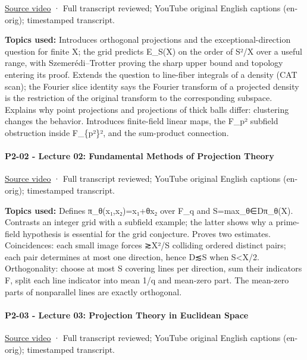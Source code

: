 \href{https://www.youtube.com/watch?v=1A1kWkxK3QY}{Source video} · Full transcript reviewed; YouTube original English captions (en-orig); timestamped transcript.

\textbf{Topics used:} Introduces orthogonal projections and the exceptional-direction question for finite X; the grid predicts \textbar E\_S(X)\textbar{} on the order of S²/\textbar X\textbar{} over a useful range, with Szemerédi--Trotter proving the sharp upper bound and topology entering its proof. Extends the question to line-fiber integrals of a density (CAT scan); the Fourier slice identity says the Fourier transform of a projected density is the restriction of the original transform to the corresponding subspace. Explains why point projections and projections of thick balls differ: clustering changes the behavior. Introduces finite-field linear maps, the F\_p² subfield obstruction inside F\_\{p²\}², and the sum-product connection.

\paragraph{P2-02 - Lecture 02: Fundamental Methods of Projection Theory}\label{p2-02---lecture-02-fundamental-methods-of-projection-theory}

\href{https://www.youtube.com/watch?v=sEZHGMV2LiI}{Source video} · Full transcript reviewed; YouTube original English captions (en-orig); timestamped transcript.

\textbf{Topics used:} Defines π\_θ(x₁,x₂)=x₁+θx₂ over F\_q and S=max\_θ∈D\textbar π\_θ(X)\textbar. Contrasts an integer grid with a subfield example; the latter shows why a prime-field hypothesis is essential for the grid conjecture. Proves two estimates. Coincidences: each small image forces ≳\textbar X\textbar²/S colliding ordered distinct pairs; each pair determines at most one direction, hence \textbar D\textbar≲S when S\textless\textbar X\textbar/2. Orthogonality: choose at most S covering lines per direction, sum their indicators F, split each line indicator into mean 1/q and mean-zero part. The mean-zero parts of nonparallel lines are exactly orthogonal.

\paragraph{P2-03 - Lecture 03: Projection Theory in Euclidean Space}\label{p2-03---lecture-03-projection-theory-in-euclidean-space}

\href{https://www.youtube.com/watch?v=OAI8C20E7R4}{Source video} · Full transcript reviewed; YouTube original English captions (en-orig); timestamped transcript.

